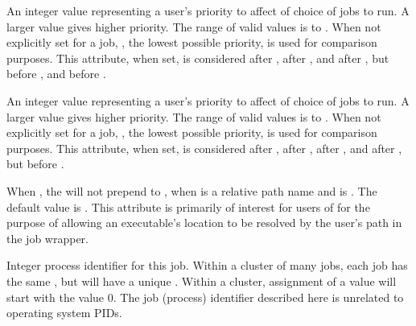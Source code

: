 \begin{description}
\item[\AdAttr{PostJobPrio1}:]  An integer value representing a user's
priority to affect of choice of jobs to run.
A larger value gives higher priority. 
The range of valid values is   to .
When not explicitly set for a job,
, the lowest possible priority, is used for comparison purposes.
This attribute, when set, is considered after , 
after ,
and after ,
but before ,
and before .

\item[\AdAttr{PostJobPrio2}:]  An integer value representing a user's
priority to affect of choice of jobs to run.
A larger value gives higher priority. 
The range of valid values is   to .
When not explicitly set for a job,
, the lowest possible priority, is used for comparison purposes.
This attribute, when set, is considered after , 
after ,
after ,
and after ,
but before .

\item[\AdAttr{PreserveRelativeExecutable}:]  When , 
the  will not prepend 
to , when  is a relative path name
and  is .  
The default value is .
This attribute is primarily of interest for users of 
for the purpose of allowing an executable's location to be resolved 
by the user's path in the job wrapper.

\item[\AdAttr{ProcId}:]  Integer process identifier for this job.
Within a cluster of many jobs,
each job has the same , but will have a unique .
Within a cluster, assignment of a  value will start
with the value 0.
The job (process) identifier described here is unrelated to operating
system PIDs.


\end{description}

